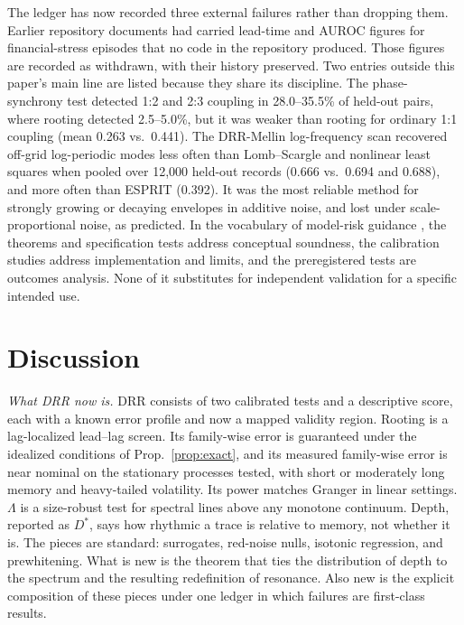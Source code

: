 \documentclass[10pt,twocolumn,letterpaper]{article}
\theoremstyle{definition}
\theoremstyle{remark}
\begin{document}
The ledger has now recorded three external failures rather than dropping them.
Earlier repository documents had carried lead-time and AUROC figures for
financial-stress episodes that no code in the repository produced. Those
figures are recorded as withdrawn, with their history preserved. Two entries
outside this paper's main line are listed because they share its discipline.
The phase-synchrony test detected 1:2 and 2:3 coupling in 28.0--35.5\% of
held-out pairs, where rooting detected 2.5--5.0\%, but it was weaker than rooting
for ordinary 1:1 coupling (mean 0.263 vs.\ 0.441). The DRR-Mellin log-frequency
scan recovered off-grid log-periodic modes less often than Lomb--Scargle
\cite{lomb,scargle} and nonlinear least squares when pooled over 12,000 held-out
records (0.666 vs.\ 0.694 and 0.688), and more often than ESPRIT \cite{esprit}
(0.392). It was the most reliable method for strongly growing or decaying
envelopes in additive noise, and lost under scale-proportional noise, as
predicted. In the vocabulary of model-risk guidance \cite{sr117}, the theorems
and specification tests address conceptual soundness, the calibration studies
address implementation and limits, and the preregistered tests are outcomes
analysis. None of it substitutes for independent validation for a specific
intended use.

\section{Discussion}

\textit{What DRR now is.} DRR consists of two calibrated tests and a descriptive
score, each with a known error profile and now a mapped validity region.
Rooting is a lag-localized lead--lag screen. Its family-wise error is
guaranteed under the idealized conditions of Prop.~\ref{prop:exact}, and its
measured family-wise error is near nominal on the stationary processes tested,
with short or moderately long memory and heavy-tailed volatility. Its power
matches Granger in linear settings. $\Lambda$ is a
size-robust test for spectral lines above any monotone continuum. Depth,
reported as $D^*$, says how rhythmic a trace is relative to memory, not whether
it is. The pieces are standard: surrogates, red-noise nulls, isotonic regression,
and prewhitening. What is new is the theorem that ties the distribution of depth to
the spectrum and the resulting redefinition of resonance. Also new is the explicit composition of
these pieces under one ledger in which failures are first-class results.
\end{document}
